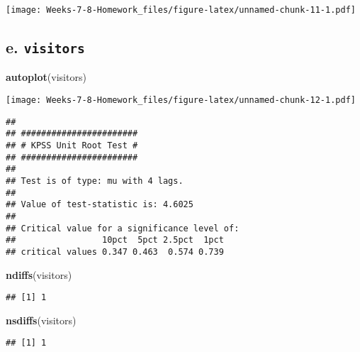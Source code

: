\documentclass[]{article}
\newenvironment{Shaded}{\begin{snugshade}}{\end{snugshade}}
\newcommand{\KeywordTok}[1]{\textcolor[rgb]{0.13,0.29,0.53}{\textbf{#1}}}
\newcommand{\NormalTok}[1]{#1}
\newcommand{\OperatorTok}[1]{\textcolor[rgb]{0.81,0.36,0.00}{\textbf{#1}}}
\newcommand{\StringTok}[1]{\textcolor[rgb]{0.31,0.60,0.02}{#1}}
\begin{document}
\texttt{[image: Weeks-7-8-Homework\_files/figure-latex/unnamed-chunk-11-1.pdf]}

\hypertarget{e.-visitors}{%
\subsection{\texorpdfstring{e.
\texttt{visitors}}{e. visitors}}\label{e.-visitors}}

\begin{Shaded}
\begin{Highlighting}[]
\KeywordTok{autoplot}\NormalTok{(visitors)}
\end{Highlighting}
\end{Shaded}

\texttt{[image: Weeks-7-8-Homework\_files/figure-latex/unnamed-chunk-12-1.pdf]}

\begin{Shaded}
\end{Shaded}

\begin{verbatim}
## 
## ####################### 
## # KPSS Unit Root Test # 
## ####################### 
## 
## Test is of type: mu with 4 lags. 
## 
## Value of test-statistic is: 4.6025 
## 
## Critical value for a significance level of: 
##                 10pct  5pct 2.5pct  1pct
## critical values 0.347 0.463  0.574 0.739
\end{verbatim}

\begin{Shaded}
\begin{Highlighting}[]
\KeywordTok{ndiffs}\NormalTok{(visitors)}
\end{Highlighting}
\end{Shaded}

\begin{verbatim}
## [1] 1
\end{verbatim}

\begin{Shaded}
\begin{Highlighting}[]
\KeywordTok{nsdiffs}\NormalTok{(visitors)}
\end{Highlighting}
\end{Shaded}

\begin{verbatim}
## [1] 1
\end{verbatim}
\end{document}
